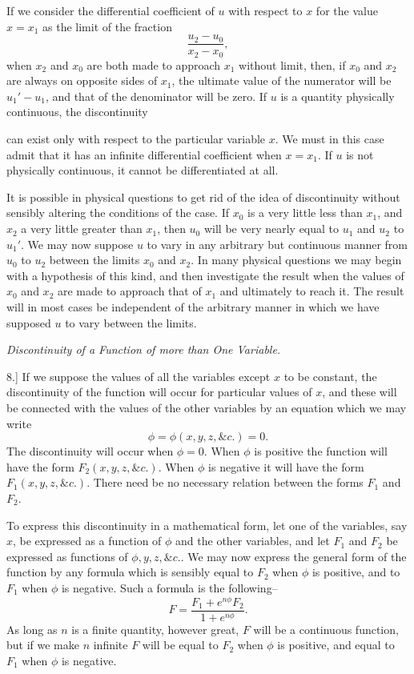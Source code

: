 \documentclass[11pt,a4paper]{article}
\begin{document}
If we consider the differential coefficient of \(u\) with respect to
\(x\) for the value \(x=x_1\) as the limit of the fraction
\[
\frac{u_2-u_0}{x_2-x_0},
\]
when \(x_2\) and \(x_0\) are both made to approach \(x_1\) without limit,
then, if \(x_0\) and \(x_2\) are always on opposite sides of \(x_1\), the
ultimate value of the numerator will be \(u_1'-u_1\), and that of the
denominator will be zero. If \(u\) is a quantity physically continuous,
the discontinuity

\clearpage

can exist only with respect to the particular variable \(x\). We must in
this case admit that it has an infinite differential coefficient when
\(x=x_1\). If \(u\) is not physically continuous, it cannot be
differentiated at all.

It is possible in physical questions to get rid of the idea of
discontinuity without sensibly altering the conditions of the case. If
\(x_0\) is a very little less than \(x_1\), and \(x_2\) a very little
greater than \(x_1\), then \(u_0\) will be very nearly equal to \(u_1\)
and \(u_2\) to \(u_1'\). We may now suppose \(u\) to vary in any
arbitrary but continuous manner from \(u_0\) to \(u_2\) between the
limits \(x_0\) and \(x_2\). In many physical questions we may begin with
a hypothesis of this kind, and then investigate the result when the
values of \(x_0\) and \(x_2\) are made to approach that of \(x_1\) and
ultimately to reach it. The result will in most cases be independent of
the arbitrary manner in which we have supposed \(u\) to vary between the
limits.

\begin{center}
\textit{Discontinuity of a Function of more than One Variable.}
\end{center}

8.] If we suppose the values of all the variables except \(x\) to be
constant, the discontinuity of the function will occur for particular
values of \(x\), and these will be connected with the values of the other
variables by an equation which we may write
\[
\phi=\phi(x,y,z,\&c.)=0.
\]
The discontinuity will occur when \(\phi=0\). When \(\phi\) is positive
the function will have the form \(F_2(x,y,z,\&c.)\). When \(\phi\) is
negative it will have the form \(F_1(x,y,z,\&c.)\). There need be no
necessary relation between the forms \(F_1\) and \(F_2\).

To express this discontinuity in a mathematical form, let one of the
variables, say \(x\), be expressed as a function of \(\phi\) and the
other variables, and let \(F_1\) and \(F_2\) be expressed as functions of
\(\phi,y,z,\&c.\). We may now express the general form of the function
by any formula which is sensibly equal to \(F_2\) when \(\phi\) is
positive, and to \(F_1\) when \(\phi\) is negative. Such a formula is the
following--
\[
F=\frac{F_1+e^{n\phi}F_2}{1+e^{n\phi}}.
\]
As long as \(n\) is a finite quantity, however great, \(F\) will be a
continuous function, but if we make \(n\) infinite \(F\) will be equal to
\(F_2\) when \(\phi\) is positive, and equal to \(F_1\) when \(\phi\) is
negative.
\end{document}
